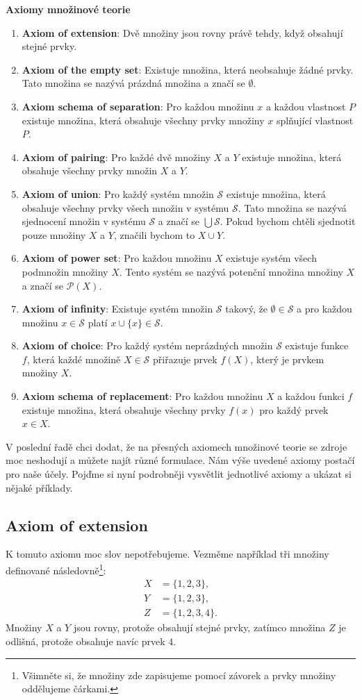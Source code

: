 \begin{definitionbox}
  \textbf{Axiomy množinové teorie}
  \begin{enumerate}
    \item \textbf{Axiom of extension}: Dvě množiny jsou rovny právě tehdy, když obsahují stejné prvky.
    \item \textbf{Axiom of the empty set}: Existuje množina, která neobsahuje žádné prvky. Tato množina se nazývá prázdná množina a značí se $\emptyset$.
    \item \textbf{Axiom schema of separation}: Pro každou množinu $x$ a každou vlastnost $P$ existuje množina, která obsahuje všechny prvky množiny $x$ splňující vlastnost $P$.
    \item \textbf{Axiom of pairing}: Pro každé dvě množiny $X$ a $Y$ existuje množina, která obsahuje všechny prvky množin $X$ a $Y$. 
    \item \textbf{Axiom of union}: Pro každý systém množin $\mathcal{S}$ existuje množina, která obsahuje všechny prvky všech množin v systému $\mathcal{S}$. Tato množina se nazývá sjednocení množin v systému $\mathcal{S}$ a značí se $\bigcup \mathcal{S}$. Pokud bychom chtěli sjednotit pouze množiny $X$ a $Y$, značili bychom to $X\cup Y$.
    \item \textbf{Axiom of power set}: Pro každou množinu $X$ existuje systém všech podmnožin množiny $X$. Tento systém se nazývá potenční množina množiny $X$ a značí se $\mathcal{P}(X)$. 
    \item \textbf{Axiom of infinity}: Existuje systém množin $\mathcal{S}$ takový, že $\emptyset\in\mathcal{S}$ a pro každou množinu $x\in\mathcal{S}$ platí $x\cup\{x\}\in\mathcal{S}$. 
    \item \textbf{Axiom of choice}: Pro každý systém neprázdných množin $\mathcal{S}$ existuje funkce $f$, která každé množině $X\in\mathcal{S}$ přiřazuje prvek $f(X)$, který je prvkem množiny $X$.
    \item \textbf{Axiom schema of replacement}: Pro každou množinu $X$ a každou funkci $f$ existuje množina, která obsahuje všechny prvky $f(x)$ pro každý prvek $x\in X$.
  \end{enumerate}
  V poslední řadě chci dodat, že na přesných axiomech množinové teorie se zdroje moc neshodují a můžete najít různé formulace. Nám výše uvedené axiomy postačí pro naše účely. Pojďme si nyní podrobněji vysvětlit jednotlivé axiomy a ukázat si nějaké příklady.
\end{definitionbox}

\subsection{Axiom of extension}
K tomuto axiomu moc slov nepotřebujeme. Vezměme například tři množiny definované následovně\footnote{Všimněte si, že množiny zde zapisujeme pomocí závorek a prvky množiny oddělujeme čárkami.}:
\begin{align*}
  X &= \{1, 2, 3\},\\
  Y &= \{1, 2, 3\},\\
  Z &= \{1, 2, 3, 4\}.
\end{align*}
Množiny $X$ a $Y$ jsou rovny, protože obsahují stejné prvky, zatímco množina $Z$ je odlišná, protože obsahuje navíc prvek $4$.
